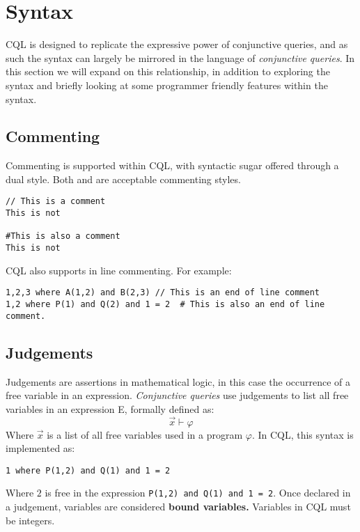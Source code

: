 \section{Syntax}
\begin{normalsize}
CQL is designed to replicate the expressive power of conjunctive queries, and as such the syntax can largely be mirrored in the language of \textit{conjunctive queries}. In this section we will expand on this relationship, in addition to exploring the syntax and briefly looking at some programmer friendly features within the syntax.

\subsection{Commenting}

Commenting is supported within CQL, with syntactic sugar offered through a dual style. Both \codeword{//} and \codeword{#} are acceptable commenting styles.
\begin{lstlisting}[style=framed]
// This is a comment
This is not

#This is also a comment
This is not
\end{lstlisting}
CQL also supports in line commenting. For example:
\begin{lstlisting}[style=framed]
1,2,3 where A(1,2) and B(2,3) // This is an end of line comment
1,2 where P(1) and Q(2) and 1 = 2  # This is also an end of line comment.
\end{lstlisting}


\subsection{Judgements}
Judgements are assertions in mathematical logic, in this case the occurrence of a free variable in an expression. \textit{Conjunctive queries} use judgements to list all free variables in an expression E, formally defined as:
$$ \overrightarrow{x} \vdash \varphi $$
Where $\overrightarrow{x}$ is a list of all free variables used in a program $\varphi$.  In CQL, this syntax is implemented as:
\begin{lstlisting}[style=framed]
1 where P(1,2) and Q(1) and 1 = 2
\end{lstlisting}
Where $2$ is free in the expression \lstinline!P(1,2) and Q(1) and 1 = 2!. Once declared in a judgement, variables are considered \textbf{bound variables.} Variables in CQL must be integers.
\end{normalsize}
